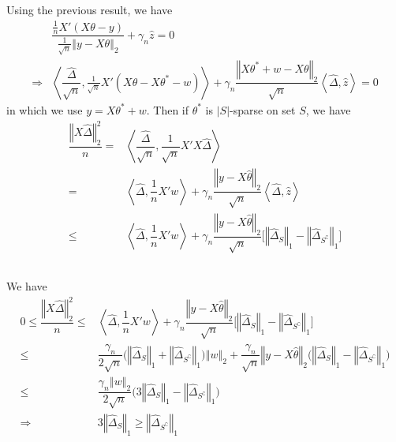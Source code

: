 \documentclass[11pt,a4paper]{ctexart}
\numberwithin{equation}{section}%
\begin{document}
\subsection{}
Using the previous result, we have
\begin{align*}
    &\dfrac{ \frac{1}{n} X'(X\theta -y) }{ \frac{1}{\sqrt{n}}\left\Vert y-X\theta  \right\Vert _2 } + \gamma _n\hat{z}=0\\
     \Rightarrow & \left\langle \dfrac{ \hat{\Delta } }{ \sqrt{n} }, \frac{1}{\sqrt{n}} X'(X\theta -X\theta ^*-w)   \right\rangle + \gamma _n \dfrac{ \left\Vert X\theta ^* + w-X\theta  \right\Vert _2 }{ \sqrt{n} } \left\langle \hat{\Delta }, \hat{z} \right\rangle =0 
\end{align*}
in which we use $ y=X\theta ^* +w $. Then if $ \theta ^* $ is $ \left\vert S \right\vert  $-sparse on set $ S $, we have
\begin{align*}
    \dfrac{ \left\Vert X\hat{\Delta } \right\Vert _2^2 }{ n }=& \left\langle \dfrac{ \hat{\Delta } }{ \sqrt{n} }, \dfrac{ 1 }{ \sqrt{n} } X'X\hat{\Delta }   \right\rangle \\
    =& \left\langle \hat{\Delta }, \dfrac{ 1 }{ n  } X'w \right\rangle + \gamma _n\dfrac{ \left\Vert y-X\hat{\theta } \right\Vert _2 }{ \sqrt{n} } \left\langle \hat{\Delta }, \hat{z} \right\rangle     \\
    \leq &\left\langle \hat{\Delta }, \dfrac{ 1 }{ n  } X'w \right\rangle + \gamma _n\dfrac{ \left\Vert y-X\hat{\theta } \right\Vert _2 }{ \sqrt{n} } \big[ \left\Vert \hat{\Delta }_S  \right\Vert _1 - \left\Vert \hat{\Delta }_{S^\complement}  \right\Vert _1  \big]
\end{align*}

\subsection{}
We have
\begin{align*}
    0\leq\dfrac{ \left\Vert X\hat{\Delta } \right\Vert _2^2 }{ n } \leq &  \left\langle \hat{\Delta }, \dfrac{ 1 }{ n  } X'w \right\rangle + \gamma _n\dfrac{ \left\Vert y-X\hat{\theta } \right\Vert _2 }{ \sqrt{n} } \big[ \left\Vert \hat{\Delta }_S  \right\Vert _1 - \left\Vert \hat{\Delta }_{S^\complement}  \right\Vert _1  \big]\\
    \leq & \dfrac{ \gamma _n  }{ 2 \sqrt{n} }  \bigl(\left\Vert \hat{\Delta } _S\right\Vert _1 +\left\Vert \hat{\Delta }_{S^\complement} \right\Vert _1 \bigr) \left\Vert w \right\Vert _2 + \dfrac{ \gamma _n  }{ \sqrt{n} }  \left\Vert y-X\hat{\theta } \right\Vert _2 \bigl(\left\Vert \hat{\Delta } _S\right\Vert _1 -\left\Vert \hat{\Delta }_{S^\complement} \right\Vert _1 \bigr)\\
    \leq  & \dfrac{ \gamma _n \left\Vert w \right\Vert _2 }{ 2\sqrt{n} }\bigl( 3\left\Vert \hat{\Delta }_S     \right\Vert _1 -\left\Vert \hat{\Delta }_{S^\complement} \right\Vert _1 \bigr)\\
     \Rightarrow &3\left\Vert \hat{\Delta }_S     \right\Vert _1 \geq \left\Vert \hat{\Delta }_{S^\complement} \right\Vert _1
\end{align*}
\end{document}
